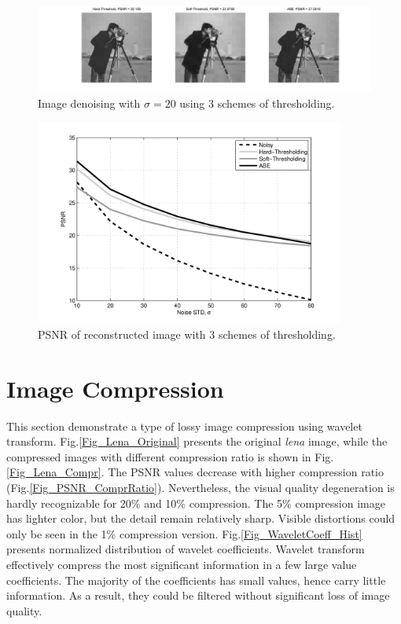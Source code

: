 \documentclass[11pt]{article}
\begin{document}
\begin{figure}[H]
	\centering
	\includegraphics[trim=2in 0.1in 2in 0in, width=6.5in]{Fig_Camera_3schemes.png}
	\caption{Image denoising with $\sigma = 20$ using 3 schemes of thresholding.}
	\label{Fig_Camera_3schemes}
\end{figure}

\begin{figure}[H]
	\centering
	\includegraphics[trim=2in 0.1in 2in 0in, width=4in]{Fig_PSNR_vs_sigma_3schemes.png}
	\caption{PSNR of reconstructed image with 3 schemes of thresholding.}
	\label{Fig_PSNR_vs_sigma_3schemes}
\end{figure}

\section{Image Compression}
This section demonstrate a type of lossy image compression using wavelet transform. Fig.\ref{Fig_Lena_Original} presents the original \textit{lena} image, while the compressed images with different compression ratio is shown in Fig.\ref{Fig_Lena_Compr}. The PSNR values decrease with higher compression ratio (Fig.\ref{Fig_PSNR_ComprRatio}). Nevertheless, the visual quality degeneration is hardly recognizable for 20\% and 10\% compression. The 5\% compression image has lighter color, but the detail remain relatively sharp. Visible distortions could only be seen in the 1\% compression version. Fig.\ref{Fig_WaveletCoeff_Hist} presents normalized distribution of wavelet coefficients. Wavelet transform effectively compress the most significant information in a few large value coefficients. The majority of the coefficients has small values, hence carry little information. As a result, they could be filtered without significant loss of image quality. 
\end{document}
